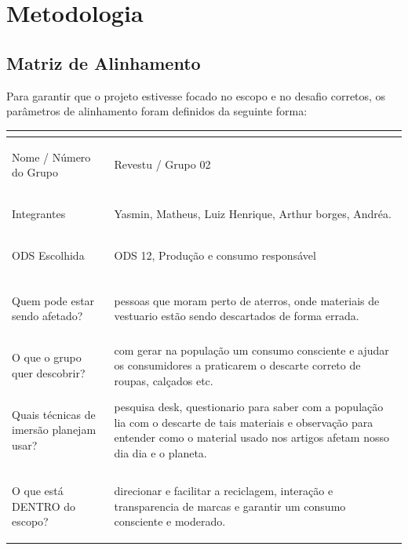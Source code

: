 \documentclass[12pt, a4paper]{article}
\newcommand{\novaSecao}[1]{\clearpage\vspace*{2.2cm}\section{#1}}
\begin{document}
\novaSecao{Metodologia}

\subsection{Matriz de Alinhamento}
Para garantir que o projeto estivesse focado no escopo e no desafio corretos, os parâmetros de alinhamento foram definidos da seguinte forma:

\renewcommand{\arraystretch}{1.45}
\begingroup
\small
\begin{xltabular}{\textwidth}{!{\color{oliveSoft}\vrule}>{\bfseries\color{oliveDeep}\raggedright\arraybackslash}p{4.1cm}!{\color{oliveSoft}\vrule}X!{\color{oliveSoft}\vrule}}
\hline
{}\\ \hline
Nome / Número do Grupo & Revestu / Grupo 02 \\ \hline
Integrantes & Yasmin, Matheus, Luiz Henrique, Arthur borges, Andréa. \\ \hline
ODS Escolhida & ODS 12, Produção e consumo responsável \\ \hline
{}\\ \hline
Quem pode estar sendo afetado? & pessoas que moram perto de aterros, onde materiais de vestuario estão sendo descartados de forma errada. \\ \hline
O que o grupo quer descobrir? & com gerar na população um consumo consciente e ajudar os consumidores a praticarem o descarte correto de roupas, calçados etc. \\ \hline
Quais técnicas de imersão planejam usar? & pesquisa desk, questionario para saber com a população lia com o descarte de tais materiais e observação para entender como o material usado nos artigos afetam nosso dia dia e o planeta. \\ \hline
{}\\ \hline
O que está DENTRO do escopo? & direcionar e facilitar a reciclagem, interação e transparencia de marcas e garantir um consumo consciente e moderado. \\ \hline

\end{xltabular}
\end{document}
